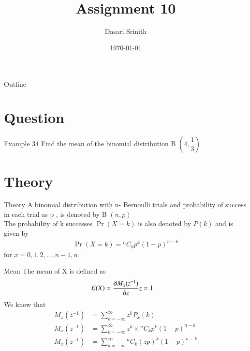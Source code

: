 \documentclass{beamer}
\title{Assignment 10}
\author{Dasari Srinith}
\date{\today}
\providecommand{\pr}[1]{\ensuremath{\Pr\left(#1\right)}}
\newcommand*{\Comb}[2]{{}^{#1}C_{#2}}
\providecommand{\brak}[1]{\ensuremath{\left(#1\right)}}
\begin{document}
    \begin{frame}
        \titlepage 
    \end{frame}

    \begin{frame}{Outline}
        \tableofcontents
    \end{frame}

    \section{Question}
    	\begin{frame}{Example 34}
    	Find the mean of the binomial distribution B \brak{4,\dfrac{1}{3}}
    	\end{frame}

    \section{Theory}
        \begin{frame}{Theory}
        A binomial distribution with n- Bernoulli trials and probability of success in each trial as p , is denoted by B \brak{n,p}
        \\\vspace{0.5cm}
        The probability of k successes $\pr{X = k}$ is also denoted by $P(k)$ and is given by 
            \begin{align}
                \pr{X = k} = \Comb{n}{k} p^k\brak{1-p}^{n-k}
                \label{eq:1}
            \end{align}
            for $x = 0,1,2,...,n-1,n$ 
        \end{frame}
        
        \begin{frame}{Mean}
        The mean of X is defined as \\
        \begin{align}
            E(X) &= \diffp {M_x(z^{-1})}z{z=1} 
        \end{align}
        We know that
        \begin{align}
            M_x(z^{-1}) &= \sum^{\infty}_{k=-\infty} z^k P_x(k) \\[10pt]
            M_x(z^{-1}) &= \sum^{\infty}_{k=-\infty} z^k \times \Comb{n}{k} p^k\brak{1-p}^{n-k} \\[10pt]
            M_x(z^{-1}) &= \sum^{\infty}_{k=-\infty} \Comb{n}{k} (zp)^k\brak{1-p}^{n-k}
        \end{align}
        \end{frame}
        
\end{document}

